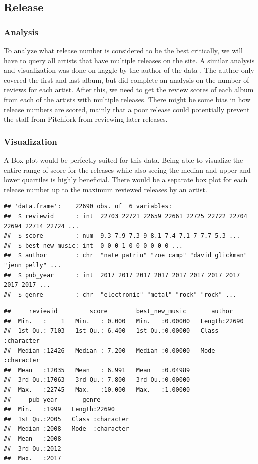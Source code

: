 \documentclass{article}
\begin{document}
\subsection{Release}\label{release}

\subsubsection{Analysis}\label{analysis-1}

To analyze what release number is considered to be the best critically,
we will have to query all artists that have multiple releases on the
site. A similar analysis and visualization was done on kaggle by the
author of the data \citep{kaggleFirst}. The author only covered the
first and last album, but did complete an analysis on the number of
reviews for each artist. After this, we need to get the review scores of
each album from each of the artists with multiple releases. There might
be some bias in how release numbers are scored, mainly that a poor
release could potentially prevent the staff from Pitchfork from
reviewing later releases.

\subsubsection{Visualization}\label{visualization-1}

A Box plot would be perfectly suited for this data. Being able to
visualize the entire range of score for the releases while also seeing
the median and upper and lower quartiles is highly beneficial. There
would be a separate box plot for each release number up to the maximum
reviewed releases by an artist.

\begin{verbatim}
## 'data.frame':    22690 obs. of  6 variables:
##  $ reviewid      : int  22703 22721 22659 22661 22725 22722 22704 22694 22714 22724 ...
##  $ score         : num  9.3 7.9 7.3 9 8.1 7.4 7.1 7 7.7 5.3 ...
##  $ best_new_music: int  0 0 0 1 0 0 0 0 0 0 ...
##  $ author        : chr  "nate patrin" "zoe camp" "david glickman" "jenn pelly" ...
##  $ pub_year      : int  2017 2017 2017 2017 2017 2017 2017 2017 2017 2017 ...
##  $ genre         : chr  "electronic" "metal" "rock" "rock" ...
\end{verbatim}

\begin{verbatim}
##     reviewid         score        best_new_music       author         
##  Min.   :    1   Min.   : 0.000   Min.   :0.00000   Length:22690      
##  1st Qu.: 7103   1st Qu.: 6.400   1st Qu.:0.00000   Class :character  
##  Median :12426   Median : 7.200   Median :0.00000   Mode  :character  
##  Mean   :12035   Mean   : 6.991   Mean   :0.04989                     
##  3rd Qu.:17063   3rd Qu.: 7.800   3rd Qu.:0.00000                     
##  Max.   :22745   Max.   :10.000   Max.   :1.00000                     
##     pub_year       genre          
##  Min.   :1999   Length:22690      
##  1st Qu.:2005   Class :character  
##  Median :2008   Mode  :character  
##  Mean   :2008                     
##  3rd Qu.:2012                     
##  Max.   :2017
\end{verbatim}
\end{document}
